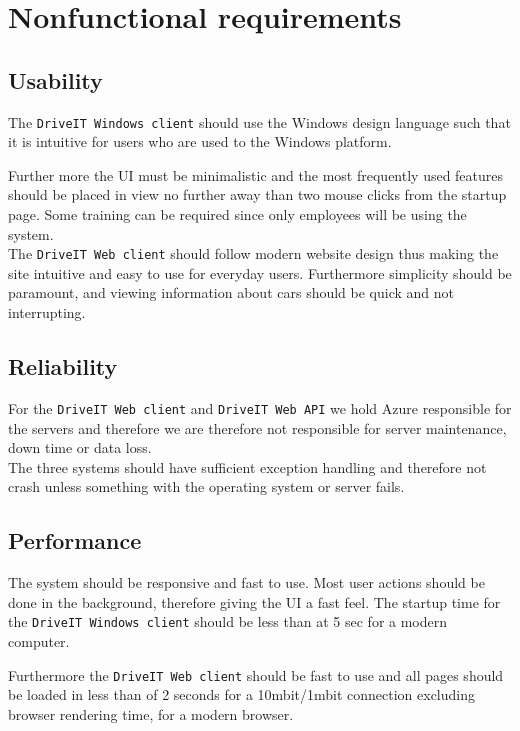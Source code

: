 \section{Nonfunctional requirements}
\subsection{Usability}
The \texttt{DriveIT Windows client} should use the Windows design language such that it is intuitive for users who are used to the Windows platform.

Further more the UI must be minimalistic and the most frequently used features should be placed in view no further away than two mouse clicks from the startup page. Some training can be required since only employees will be using the system. \\

The \texttt{DriveIT Web client} should follow modern website design thus making the site intuitive and easy to use for everyday users. Furthermore simplicity should be paramount, and viewing information about cars should be quick and not interrupting.

\subsection{Reliability}
For the \texttt{DriveIT Web client} and \texttt{DriveIT Web API} we hold Azure responsible for the servers and therefore we are therefore not responsible for server maintenance, down time or data loss. \\

The three systems should have sufficient exception handling and therefore not crash unless something with the operating system or server fails.

\subsection{Performance}
The system should be responsive and fast to use. Most user actions should be done in the background, therefore giving the UI a fast feel. The startup time for the \texttt{DriveIT Windows client} should be less than at 5 sec for a modern computer. 

Furthermore the \texttt{DriveIT Web client} should be fast to use and all pages should be loaded in less than of 2 seconds for a 10mbit/1mbit connection excluding browser rendering time, for a modern browser.


